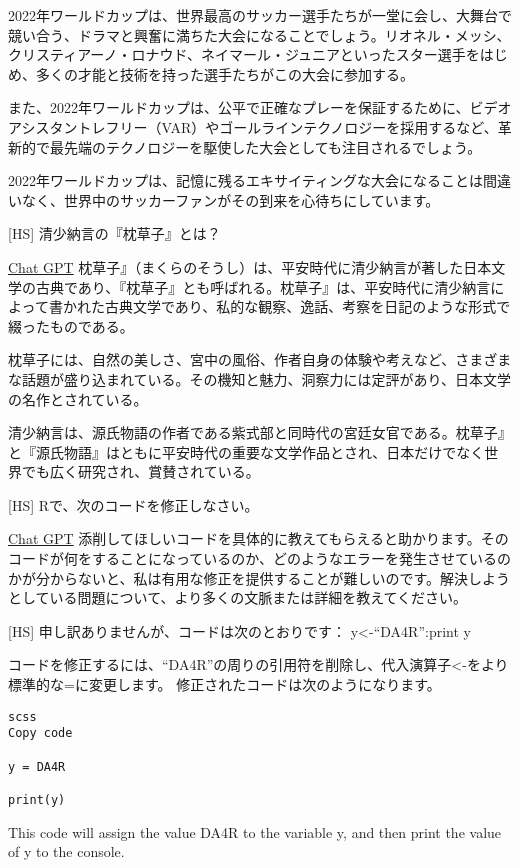 \documentclass[
]{book}
\theoremstyle{definition}
\theoremstyle{definition}
\theoremstyle{definition}
\theoremstyle{definition}
\theoremstyle{remark}
\begin{document}
2022年ワールドカップは、世界最高のサッカー選手たちが一堂に会し、大舞台で競い合う、ドラマと興奮に満ちた大会になることでしょう。リオネル・メッシ、クリスティアーノ・ロナウド、ネイマール・ジュニアといったスター選手をはじめ、多くの才能と技術を持った選手たちがこの大会に参加する。

また、2022年ワールドカップは、公平で正確なプレーを保証するために、ビデオアシスタントレフリー（VAR）やゴールラインテクノロジーを採用するなど、革新的で最先端のテクノロジーを駆使した大会としても注目されるでしょう。

2022年ワールドカップは、記憶に残るエキサイティングな大会になることは間違いなく、世界中のサッカーファンがその到来を心待ちにしています。

{[}HS{]} 清少納言の『枕草子』とは？

\protect\hyperlink{chatgpt}{Chat GPT} 枕草子』（まくらのそうし）は、平安時代に清少納言が著した日本文学の古典であり、『枕草子』とも呼ばれる。枕草子』は、平安時代に清少納言によって書かれた古典文学であり、私的な観察、逸話、考察を日記のような形式で綴ったものである。

枕草子には、自然の美しさ、宮中の風俗、作者自身の体験や考えなど、さまざまな話題が盛り込まれている。その機知と魅力、洞察力には定評があり、日本文学の名作とされている。

清少納言は、源氏物語の作者である紫式部と同時代の宮廷女官である。枕草子』と『源氏物語』はともに平安時代の重要な文学作品とされ、日本だけでなく世界でも広く研究され、賞賛されている。

{[}HS{]} Rで、次のコードを修正しなさい。

\protect\hyperlink{chatgpt}{Chat GPT} 添削してほしいコードを具体的に教えてもらえると助かります。そのコードが何をすることになっているのか、どのようなエラーを発生させているのかが分からないと、私は有用な修正を提供することが難しいのです。解決しようとしている問題について、より多くの文脈または詳細を教えてください。

{[}HS{]} 申し訳ありませんが、コードは次のとおりです： y\textless-``DA4R'':print y

コードを修正するには、``DA4R''の周りの引用符を削除し、代入演算子\textless-をより標準的な=に変更します。 修正されたコードは次のようになります。

\begin{verbatim}
scss
Copy code

y = DA4R

print(y)
\end{verbatim}

This code will assign the value DA4R to the variable y, and then print the value of y to the console.
\end{document}

